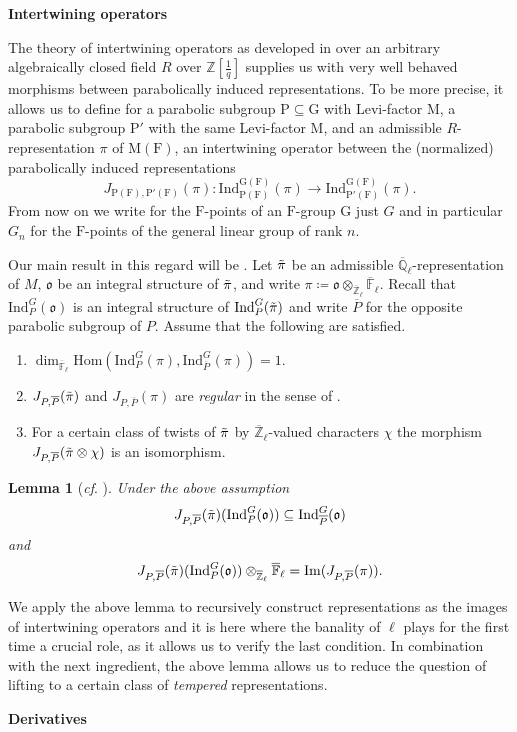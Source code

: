 \documentclass[10pt,a4paper]{article}
\newtheorem{lemma}{Lemma}
\theoremstyle{remark}
\theoremstyle{definition}
\newcommand{\fl}{{\overline{\mathbb{F}}_\ell}}
\newcommand{\ql}{{\overline{\mathbb{Q}}_\ell}}
\newcommand{\zl}{{\overline{\mathbb{Z}}_\ell}}
\newcommand{\ip}{\mathrm{Ind}_P^G}
\newcommand{\df}{\dim_\fl}
\newcommand{\ho}{\mathrm{Hom}}
\newcommand{\bl}{\otimes_\zl\fl}
\newcommand{\im}{\mathrm{Im}}
\newcommand{\op}{\overline{P}}
\newcommand{\id}{\mathrm{Ind}}
\newcommand{\fo}{\mathfrak{o}}
\newcommand{\ra}{\rightarrow}
\newcommand{\tpi}{\Tilde{\pi}}
\newcommand{\FF}{\mathrm{F}}
\newcommand{\mG}{\mathrm{G}   }
\newcommand{\mM}{\mathrm{M}}
\newcommand{\mP}{\mathrm{P}}
\newcommand{\ZZ}{\mathbb{Z}}
\begin{document}
\textbf{Intertwining operators}

The theory of intertwining operators as developed in \cite{Dat05} over an arbitrary algebraically closed field $R$ over $\ZZ[\frac{1}{q}]$ supplies us with very well behaved morphisms 
between parabolically induced representations. To be more precise, it allows us to define for a parabolic subgroup $\mP\subseteq\mG$ with Levi-factor $\mM$, a parabolic subgroup $\mP'$ with the same Levi-factor $\mM$, and an admissible $R$-representation $\pi$ of $\mM(\FF)$, an intertwining operator between the (normalized) parabolically induced representations
\[J_{\mP(\FF),\mP'(\FF)}(\pi)\colon \id_{\mP(\FF)}^{\mG(\FF)}(\pi)\ra\id_{\mP'(\FF)}^{\mG(\FF)}(\pi).\]
From now on we write for the $\FF$-points of an $\FF$-group $\mG$ just $G$ and in particular $G_n$ for the $
\FF$-points of the general linear group of rank $n$.

Our main result in this regard will be .
Let $\tpi$ be an admissible $\ql$-representation of $M$, $\fo$ be an integral structure of $\tpi$, and write $\pi\coloneqq\fo\bl$. Recall that $\ip(\fo)$ is an integral structure of $\ip(\tpi)$ and write $\op$ for the opposite parabolic subgroup of $P$.
Assume that the following are satisfied.
    \begin{enumerate}
        \item $\df\ho(\ip(\pi),\id_{\op}^G(\pi))=1$.
        \item $J_{P,\op}(\tpi)$ and $J_{P,\op}(\pi)$ are \emph{regular} in the sense of \cite[§7]{Dat05}.
        \item For a certain class of twists of $\tpi$ by $\zl$-valued characters $\chi$ the morphism
  $J_{P,\op}(\tpi\otimes\chi)$ is an isomorphism.  
    \end{enumerate}
\begin{lemma}[{\emph{cf}. }]
     Under the above assumption \[J_{P,\overline{P}}(\tpi)(\ip(\fo))\subseteq \id_{\op}^G(\fo)\] and \[J_{P,\overline{P}}(\tpi)(\ip(\fo))\bl=\im(J_{P,\op}(\pi)).\]
\end{lemma}
We apply the above lemma to recursively construct representations as the images of intertwining operators and it is here where the banality of $\ell$ plays for the first time a crucial role, as it allows us to verify the last condition.
In combination with the next ingredient, the above lemma allows us to reduce the question of lifting to a certain class of \emph{tempered} representations.

\textbf{Derivatives}
\end{document}
